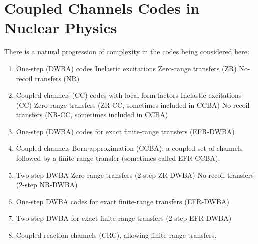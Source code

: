 \documentclass[11pt,a4paper]{article}
\begin{document}
\section{Coupled Channels Codes in Nuclear Physics}

There is a natural progression of complexity in the codes being
considered here:
\begin{enumerate}
\item One-step (DWBA) codes
 Inelastic excitations
 Zero-range transfers (ZR)
 No-recoil transfers (NR)
\item Coupled channels (CC) codes with local form factors
 Inelastic excitations (CC)
 Zero-range transfers (ZR-CC, sometimes included in CCBA)
 No-recoil transfers (NR-CC, sometimes included in CCBA)
\item One-step (DWBA) codes for exact finite-range transfers (EFR-DWBA)
\item Coupled channels Born approximation (CCBA): a coupled set of channels
followed by a finite-range transfer (sometimes called EFR-CCBA).
\item Two-step DWBA
 Zero-range transfers (2-step ZR-DWBA)
 No-recoil transfers (2-step NR-DWBA)
\item One-step DWBA codes for exact finite-range transfers (EFR-DWBA)
\item Two-step DWBA for exact finite-range transfers (2-step EFR-DWBA)
\item Coupled reaction channels (CRC), allowing finite-range transfers.
\end{enumerate}
\end{document}
